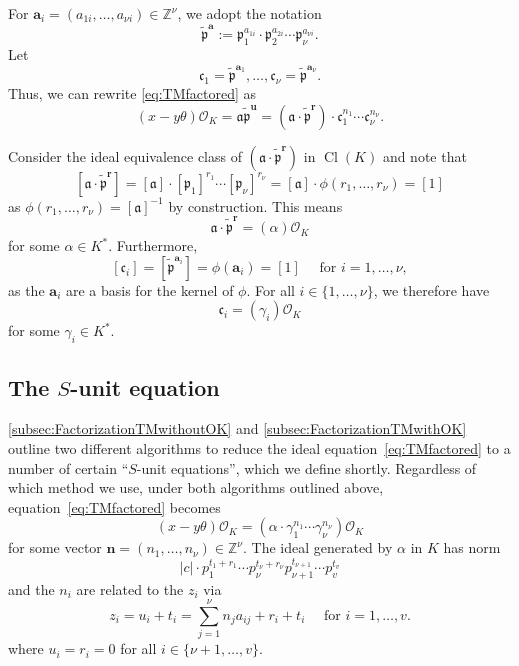 \documentclass[11pt]{report}
\theoremstyle{definition}
\DeclareMathOperator{\Cl}{Cl}
\begin{document}
For $\mathbf{a}_i=(a_{1i},\dotsc,a_{\nu i}) \in \mathbb{Z}^{\nu}$, we adopt the notation
\[\tilde{\mathfrak{p}}^\mathbf{a} :=\mathfrak{p}_1^{a_{1i}}\cdot \mathfrak{p}_2^{a_{2i}} \cdots \mathfrak{p}_{\nu}^{a_{\nu i}}.\]
Let
\[\mathfrak{c}_1= \tilde{\mathfrak{p}}^{\mathbf{a}_1},\dotsc,\mathfrak{c}_{\nu}= \tilde{\mathfrak{p}}^{\mathbf{a}_{\nu}}.\]
Thus, we can rewrite \eqref{eq:TMfactored} as
\[(x-y\theta) \mathcal{O}_K = \mathfrak{a} \tilde{\mathfrak{p}}^{\mathbf{u}} = (\mathfrak{a} \cdot \tilde{\mathfrak{p}}^\mathbf{r}) \cdot \mathfrak{c}_1^{n_1}\cdots \mathfrak{c}_{\nu}^{n_{\nu}}.\]

Consider the ideal equivalence class of $(\mathfrak{a} \cdot \tilde{\mathfrak{p}}^\mathbf{r})$ in $\Cl(K)$ and note that
\[[\mathfrak{a} \cdot \tilde{\mathfrak{p}}^\mathbf{r}]
	= [\mathfrak{a}] \cdot [\mathfrak{p}_1]^{r_1}\cdots [\mathfrak{p}_{\nu}]^{r_{\nu}}
	= [\mathfrak{a}]\cdot \phi(r_1,\dotsc,r_{\nu})=[1]\]
as $\phi(r_1,\dotsc,r_{\nu})=[\mathfrak{a}]^{-1}$ by construction. This means
\[\mathfrak{a} \cdot \tilde{\mathfrak{p}}^\mathbf{r}= (\alpha) \mathcal{O}_K\]
for some $\alpha \in K^*$. Furthermore,
\[[\mathfrak{c}_i] = [\tilde{\mathfrak{p}}^{\mathbf{a}_i}] = \phi(\mathbf{a}_i) = [1] \quad \text{ for } i = 1, \dots, \nu,\]
as the $\mathbf{a}_i$ are a basis for the kernel of $\phi$. For all $i \in \{1, \dots, {\nu}\}$, we therefore have
\[\mathfrak{c}_i= (\gamma_i) \mathcal{O}_K\]
for some $\gamma_i \in K^*$.


\subsection{The $S$-unit equation}
\label{subsec:SUnitEquation}

\autoref{subsec:FactorizationTMwithoutOK} and  \autoref{subsec:FactorizationTMwithOK} outline two different algorithms to reduce the ideal equation~\eqref{eq:TMfactored} to a number of certain ``$S$-unit equations'', which we define shortly. Regardless of which method we use, under both algorithms outlined above, equation~\eqref{eq:TMfactored} becomes
\begin{equation} \label{eq:TMprincipal}
(x-y\theta) \mathcal{O}_K= (\alpha \cdot \gamma_1^{n_1} \cdots \gamma_{\nu}^{n_{\nu}}) \mathcal{O}_K
\end{equation}
for some vector $\mathbf{n} = (n_1, \dots, n_{\nu}) \in \mathbb{Z}^{\nu}$. The ideal generated by $\alpha$ in $K$ has norm
\[|c|\cdot p_1^{t_1 + r_1} \cdots p_{\nu}^{t_{\nu} + r_{\nu}}p_{\nu +1}^{t_{\nu +1}} \cdots p_v^{t_v}\]
and the $n_i$ are related to the $z_i$ via
\[z_i = u_i + t_i = \sum_{j = 1}^{\nu}n_ja_{ij} + r_i + t_i \quad \text{ for } i =1, \dots, v.\]
where $u_i = r_i = 0$ for all $i \in \{\nu + 1, \dots, v\}$.
\end{document}
